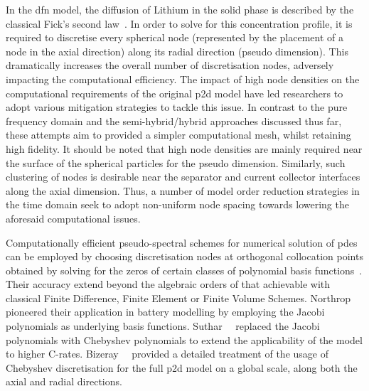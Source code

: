 In the \gls{dfn} model, the diffusion of Lithium in the solid phase is described
by the classical  Fick's second law~\cite{Fick1995}. In order to  solve for this
concentration  profile,  it  is  required to  discretise  every  spherical  node
(represented by the placement of a node in the axial direction) along its radial
direction (pseudo dimension). This dramatically  increases the overall number of
discretisation  nodes, adversely  impacting  the  computational efficiency.  The
impact of high node densities on  the computational requirements of the original
\gls{p2d}  model have  led researchers  to adopt  various mitigation  strategies
to  tackle  this  issue. In  contrast  to  the  pure  frequency domain  and  the
semi-hybrid/hybrid approaches discussed thus far, these attempts aim to provided
a simpler computational mesh, whilst retaining high fidelity. It should be noted
that high node  densities are mainly required near the  surface of the spherical
particles for the pseudo   dimension. Similarly, such clustering
of nodes is desirable near the  separator and current collector interfaces along
the axial  dimension.
Thus, a number  of model order reduction  strategies in the time  domain seek to
adopt  non-uniform node  spacing  towards lowering  the aforesaid  computational
issues.


Computationally    efficient     pseudo-spectral    schemes     for    numerical
solution   of   \gls{pde}s   can be employed    by   choosing   discretisation
nodes    at    orthogonal    collocation     points    obtained    by    solving
for     the    zeros     of    certain     classes    of     polynomial    basis
functions~\cite{Ferguson1971,Trefethen2000,Boyd2001,Shizgal2015,Dutykh2016}.
Their accuracy extend beyond  the  algebraic  orders of that achievable with
classical  Finite  Difference,  Finite Element  or Finite Volume Schemes.
Northrop~\etal{}~\cite{Northrop2011} pioneered their application in battery
modelling by employing the Jacobi polynomials as underlying basis functions.
Suthar~\etal{}~\cite{Suthar2014} replaced the Jacobi polynomials with Chebyshev
polynomials to extend the applicability of the model to higher C-rates.
Bizeray~\etal{}~\cite{Bizeray2015}    provided   a detailed treatment of the
usage of Chebyshev discretisation  for   the  full   \gls{p2d} model   on  a
global  scale,  \ie{}  along  both   the  axial  and  radial directions.


